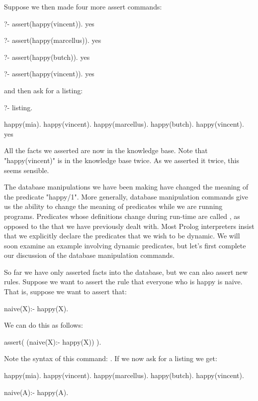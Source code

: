Suppose we then made four more assert commands:
\begin{LPNcodedisplay}
?- assert(happy(vincent)).
yes

?- assert(happy(marcellus)).
yes

?- assert(happy(butch)).
yes

?- assert(happy(vincent)).
yes
\end{LPNcodedisplay}
and then ask  for a listing:
\begin{LPNcodedisplay}
?- listing.

happy(mia).
happy(vincent).
happy(marcellus).
happy(butch).
happy(vincent).
yes
\end{LPNcodedisplay}
All the facts we asserted are now in the knowledge base.  Note that
"happy(vincent)" is in the knowledge base twice. As we asserted
it twice, this seems sensible.

The database manipulations we have been making have changed the
meaning of the predicate "happy/1".  More generally, database
manipulation commands give us the ability to change the meaning of
predicates while we are running programs.  Predicates whose
definitions change during run-time are called , as opposed to the  that we have
previously dealt with.  Most Prolog interpreters insist that we
explicitly declare the predicates that we wish to be dynamic. We will
soon examine an example involving dynamic predicates, but let's first
complete our discussion of the database manipulation commands.


So far we have only asserted facts into the database, but we can also
assert new rules.  Suppose we want to assert the rule that
everyone who is happy is naive.  That is, suppose we want to assert
that:
\begin{LPNcodedisplay}
naive(X):- happy(X).
\end{LPNcodedisplay}
We can do this as follows:
\begin{LPNcodedisplay}
assert( (naive(X):- happy(X)) ).
\end{LPNcodedisplay}
Note the syntax of this command: .  If we now ask for a listing we get:
\begin{LPNcodedisplay}
happy(mia).
happy(vincent).
happy(marcellus).
happy(butch).
happy(vincent).

naive(A):-
   happy(A).
\end{LPNcodedisplay}


